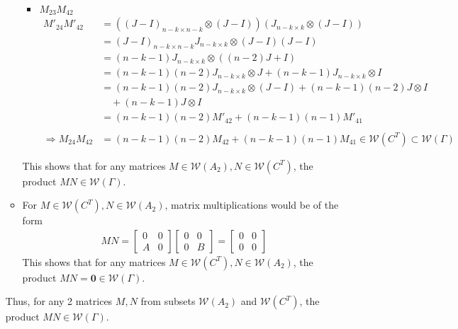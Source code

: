 \documentclass{article}
\begin{document}
\begin{itemize}
\begin{itemize}
\begin{itemize}
            \item $M_{23}M_{42}$
            \begin{align*}
                M'_{24}M'_{42}
                &= ((J-I)_{n-k\times n-k} \otimes (J-I))(J_{n-k\times k}\otimes (J-I)) \\
                &= (J-I)_{n-k\times n-k}J_{n-k\times k}\otimes (J-I)(J-I) \\
                &= (n-k-1)J_{n-k\times k}\otimes ((n-2)J+I)\\
                &= (n-k-1)(n-2)J_{n-k\times k}\otimes J + (n-k-1)J_{n-k\times k}\otimes I \\
                &= (n-k-1)(n-2)J_{n-k\times k}\otimes (J-I) + (n-k-1)(n-2)J\otimes I \\
                &\quad +(n-k-1)J\otimes I \\
                &= (n-k-1)(n-2)M'_{42} + (n-k-1)(n-1)M'_{41} \\\\
                \Rightarrow M_{24}M_{42} &= (n-k-1)(n-2)M_{42} + (n-k-1)(n-1)M_{41} \in\mathcal{W}(C^T)\subset\mathcal{W}(\Gamma)
            \end{align*}
        \end{itemize}
        This shows that for any matrices $M\in\mathcal{W}(A_2),N \in \mathcal{W}(C^T)$, the product $MN \in\mathcal{W}(\Gamma)$.
        
        \item For $M\in\mathcal{W}(C^T),N \in \mathcal{W}(A_2)$, matrix multiplications would be of the form \\
        \begin{align*}
            MN = \begin{bmatrix}
                0 & 0 \\ A & 0
            \end{bmatrix}\begin{bmatrix}
                0&0\\0&B
            \end{bmatrix} = \begin{bmatrix}
                0&0\\0&0
            \end{bmatrix}
        \end{align*}
        This shows that for any matrices $M\in\mathcal{W}(C^T),N \in \mathcal{W}(A_2)$, the product $MN = \mathbf{0}\in\mathcal{W}(\Gamma)$.
    \end{itemize}
    Thus, for any 2 matrices $M,N$ from subsets $\mathcal{W}(A_2)$ and $\mathcal{W}(C^T)$, the product $MN \in \mathcal{W}(\Gamma)$.


\end{itemize}
\end{document}
